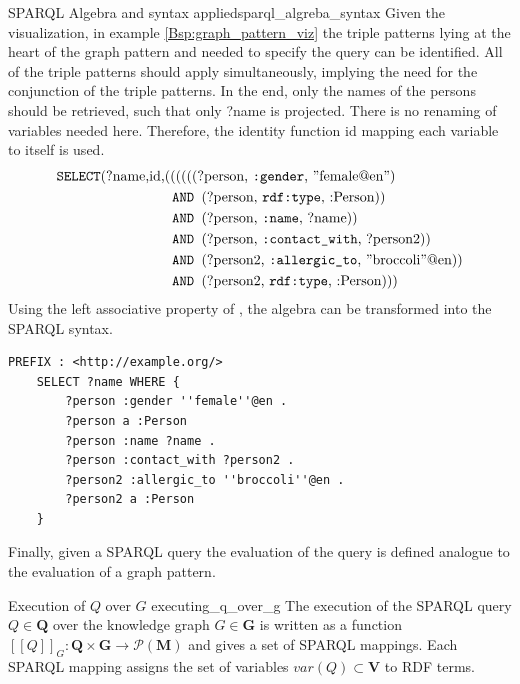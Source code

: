 \begin{Bsp}{SPARQL Algebra and syntax applied}{sparql_algreba_syntax}
Given the visualization, in example \ref{Bsp:graph_pattern_viz} the triple patterns lying at the heart of the graph pattern and needed to specify the query can be identified. All of the triple patterns should apply simultaneously, implying the need for the conjunction of the triple patterns. In the end, only the names of the persons should be retrieved, such that only ?name is projected. There is no renaming of variables needed here. Therefore, the identity function $\text{id}$ mapping each variable to itself is used.
\begin{align*}
        \text{\texttt{SELECT}(?name,$\text{id}$,} & \text{((((((?person, \texttt{:gender}, ''female@en'')} \\
        &\text{\texttt{ AND }} \text{(?person, \texttt{rdf:type}, :Person))} \\
        &\text{\texttt{ AND }} \text{(?person, \texttt{:name}, ?name))} \\
        &\text{\texttt{ AND }} \text{(?person, \texttt{:contact\_with}, ?person2))} \\
        &\text{\texttt{ AND }} \text{(?person2, \texttt{:allergic\_to}, ''broccoli''@en))} \\
        &\text{\texttt{ AND }} \text{(?person2, \texttt{rdf:type}, :Person)))} \\
\end{align*}
Using the left associative property of , the algebra can be transformed into the SPARQL syntax.

    \lstset{language=html}
    \begin{lstlisting}[captionpos=b, caption=Algebra transformed into SPARQL syntax , label=lst:sparql_algebra_example, basicstyle=\ttfamily, frame=single]
    PREFIX : <http://example.org/>
    SELECT ?name WHERE {
        ?person :gender ''female''@en .
        ?person a :Person
        ?person :name ?name .
        ?person :contact_with ?person2 .
        ?person2 :allergic_to ''broccoli''@en .
        ?person2 a :Person
    }

    \end{lstlisting}
\end{Bsp}


Finally, given a SPARQL  query the evaluation of the query is defined analogue to the evaluation of a graph pattern.

\begin{Def}{Execution of $Q$ over $G$ \cite{corman2019validating}}{executing_q_over_g}
The execution of the SPARQL  query $Q \in \mathbf{Q}$ over the knowledge graph $G \in \mathbf{G}$ is written as a function $[[Q]]_G: \mathbf{Q} \times \mathbf{G} \to \mathcal{P}(\mathbf{M})$ and gives a set of SPARQL mappings. Each SPARQL mapping assigns the set of variables $var(Q) \subset \mathbf{V}$ to RDF terms.
\end{Def}

